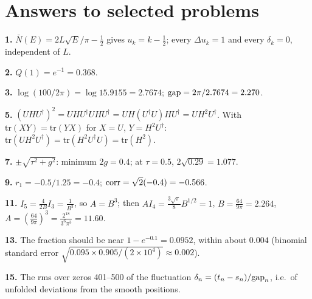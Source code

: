 \begin{problemlist}
\end{problemlist}

\section{Answers to selected problems}\label{sec:level-statistics-answers}
\textbf{1.} $\bar N(E)=2L\sqrt E/\pi-\tfrac12$ gives $u_k=k-\tfrac12$; every $\Delta u_k=1$ and every $\delta_k=0$, independent of $L$.

\textbf{2.} $Q(1)=e^{-1}=0.368$.

\textbf{3.} $\log(100/2\pi)=\log15.9155=2.7674$; $\mathrm{gap}=2\pi/2.7674=2.270$.

\textbf{5.} $(UHU^\dagger)^2=UHU^\dagger UHU^\dagger=UH(U^\dagger U)HU^\dagger=UH^2U^\dagger$. With $\mathrm{tr}(XY)=\mathrm{tr}(YX)$ for $X=U$, $Y=H^2U^\dagger$: $\mathrm{tr}(UH^2U^\dagger)=\mathrm{tr}(H^2U^\dagger U)=\mathrm{tr}(H^2)$.

\textbf{7.} $\pm\sqrt{\tau^2+g^2}$: minimum $2g=0.4$; at $\tau=0.5$, $2\sqrt{0.29}=1.077$.

\textbf{9.} $r_1=-0.5/1.25=-0.4$; $\mathrm{corr}=\sqrt2(-0.4)=-0.566$.

\textbf{11.} $I_5=\frac{4}{2B}I_3=\frac{1}{B^3}$, so $A=B^3$; then $AI_4=\frac{3\sqrt\pi}{8}B^{1/2}=1$, $B=\frac{64}{9\pi}=2.264$, $A=\left(\frac{64}{9\pi}\right)^3=\frac{2^{18}}{3^6\pi^3}=11.60$.

\textbf{13.} The fraction should be near $1-e^{-0.1}=0.0952$, within about $0.004$ (binomial standard error $\sqrt{0.095\times0.905/(2\times10^4)}\approx0.002$).

\textbf{15.} The rms over zeros 401--500 of the fluctuation $\delta_n=(t_n-s_n)/\mathrm{gap}_n$, i.e.\ of unfolded deviations from the smooth positions.

